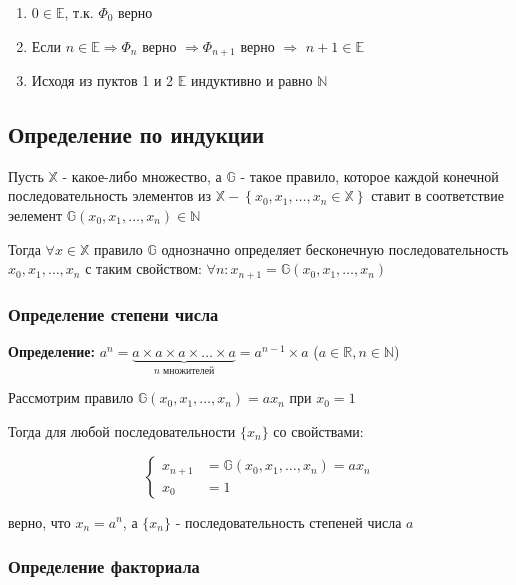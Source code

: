 \documentclass[class=article,a4paper,12pt,crop=false]{standalone}
\begin{document}
\begin{enumerate}
  \item {
    $0 \in \mathbb{E}$, т.к. $\Phi_0$ верно
  }
  \item {
    Если $n \in \mathbb{E} \Rightarrow \Phi_n$ верно
    $\Rightarrow \Phi_{n + 1}$ верно $\Rightarrow$
    $n + 1 \in \mathbb{E}$
  }
  \item {
    Исходя из пуктов 1 и 2 $\mathbb{E}$ индуктивно и равно $\mathbb{N}$
  }
\end{enumerate}

\subsection{Определение по индукции}

Пусть $\mathbb{X}$ - какое-либо множество, а $\mathbb{G}$ - такое
правило, которое каждой конечной последовательность элементов из
$\mathbb{X} - \left\{ x_0, x_1, \dots, x_n \in \mathbb{X}\right\}$
ставит в соответствие эелемент $\mathbb{G}\left(x_0, x_1, \dots, x_n\right) \in \mathbb{N}$

Тогда $\forall x \in \mathbb{X}$ правило $\mathbb{G}$ однозначно
определяет бесконечную последовательность $x_0, x_1, \dots, x_n$
с таким свойством: $\forall n: x_{n + 1} = \mathbb{G}\left(x_0, x_1, \dots, x_n\right)$

\subsubsection{Определение степени числа}

\textbf{Определение:} 
$a^n = \underbrace{a \times a \times a \times \dots \times a}_{n \text{ множителей}}
= a^{n - 1}\times a$ ($a \in \mathbb{R}, n \in \mathbb{N}$)

Рассмотрим правило $\mathbb{G}(x_0, x_1, \dots, x_n)=ax_n$ при $x_0 = 1$

Тогда для любой последовательности $\{x_n\}$ со свойствами:

\begin{equation}
  \begin{cases}
    x_{n + 1} & = \mathbb{G}(x_0, x_1, \dots, x_n) = ax_n \\
    x_0 & = 1
  \end{cases}
\end{equation}

верно, что $x_n = a^n$, а $\{x_n\}$ - последовательность степеней числа $a$

\subsubsection{Определение факториала}
\end{document}
